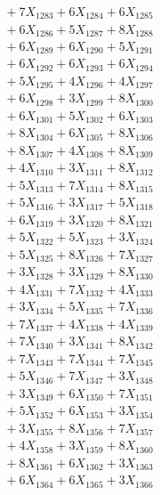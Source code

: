 \documentclass[a4paper,10pt]{article}
\begin{document}
{\begin{align}
&\;  + 7 X_{1283} + 6 X_{1284} + 6 X_{1285} \\[0.3ex]
&\;  + 6 X_{1286} + 5 X_{1287} + 8 X_{1288} \\[0.3ex]
&\;  + 6 X_{1289} + 6 X_{1290} + 5 X_{1291} \\[0.3ex]
&\;  + 6 X_{1292} + 6 X_{1293} + 6 X_{1294} \\[0.3ex]
&\;  + 5 X_{1295} + 4 X_{1296} + 4 X_{1297} \\[0.3ex]
&\;  + 6 X_{1298} + 3 X_{1299} + 8 X_{1300} \\[0.5ex]\allowbreak
&\;  + 6 X_{1301} + 5 X_{1302} + 6 X_{1303} \\[0.3ex]
&\;  + 8 X_{1304} + 6 X_{1305} + 8 X_{1306} \\[0.3ex]
&\;  + 8 X_{1307} + 4 X_{1308} + 8 X_{1309} \\[0.3ex]
&\;  + 4 X_{1310} + 3 X_{1311} + 8 X_{1312} \\[0.3ex]
&\;  + 5 X_{1313} + 7 X_{1314} + 8 X_{1315} \\[0.3ex]
&\;  + 5 X_{1316} + 3 X_{1317} + 5 X_{1318} \\[0.3ex]
&\;  + 6 X_{1319} + 3 X_{1320} + 8 X_{1321} \\[0.3ex]
&\;  + 5 X_{1322} + 5 X_{1323} + 3 X_{1324} \\[0.3ex]
&\;  + 5 X_{1325} + 8 X_{1326} + 7 X_{1327} \\[0.3ex]
&\;  + 3 X_{1328} + 3 X_{1329} + 8 X_{1330} \\[0.5ex]\allowbreak
&\;  + 4 X_{1331} + 7 X_{1332} + 4 X_{1333} \\[0.3ex]
&\;  + 3 X_{1334} + 5 X_{1335} + 7 X_{1336} \\[0.3ex]
&\;  + 7 X_{1337} + 4 X_{1338} + 4 X_{1339} \\[0.3ex]
&\;  + 7 X_{1340} + 3 X_{1341} + 8 X_{1342} \\[0.3ex]
&\;  + 7 X_{1343} + 7 X_{1344} + 7 X_{1345} \\[0.3ex]
&\;  + 5 X_{1346} + 7 X_{1347} + 3 X_{1348} \\[0.3ex]
&\;  + 3 X_{1349} + 6 X_{1350} + 7 X_{1351} \\[0.3ex]
&\;  + 5 X_{1352} + 6 X_{1353} + 3 X_{1354} \\[0.3ex]
&\;  + 3 X_{1355} + 8 X_{1356} + 7 X_{1357} \\[0.3ex]
&\;  + 4 X_{1358} + 3 X_{1359} + 8 X_{1360} \\[0.5ex]\allowbreak
&\;  + 8 X_{1361} + 6 X_{1362} + 3 X_{1363} \\[0.3ex]
&\;  + 6 X_{1364} + 6 X_{1365} + 3 X_{1366} \\[0.3ex]

\end{align}}
\end{document}
